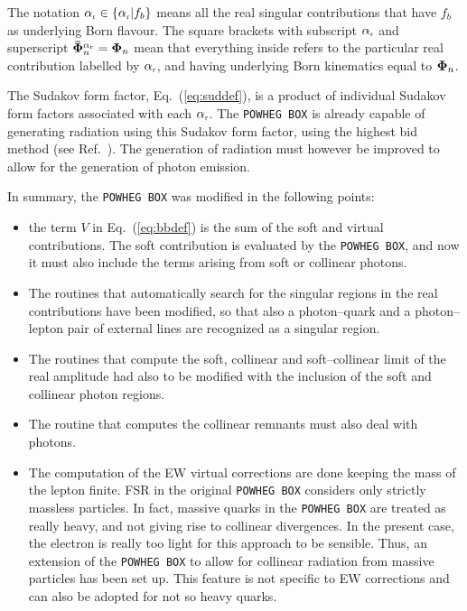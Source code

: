 \documentclass[11pt,a4paper]{article}
\newcommand\fb{{f_b}}
\newcommand\Kinn{{\bf \Phi}_n}
\newcommand\sss{\mathchoice%
{\displaystyle}%
{\scriptstyle}%
{\scriptscriptstyle}%
{\scriptscriptstyle}%
}
\newcommand\frindsing{{\ctindr}}
\newcommand\ctindr{{\alpha_{\sss\rm r}}}
\newcommand\BKinn{{\bf \bar{\Phi}}_n}
\newcommand\POWHEGBOX{\texttt{POWHEG BOX}}
\begin{document}
The notation $\frindsing\in\{\frindsing|\fb\}$ means all the real
singular contributions that have $\fb$ as underlying Born flavour. The
square brackets with subscript $\frindsing$ and superscript
$\BKinn^\frindsing=\Kinn$ mean that everything inside refers to the
particular real contribution labelled by $\frindsing$, and having
underlying Born kinematics equal to $\Kinn$.

The Sudakov form factor, Eq.~(\ref{eq:suddef}), is a product of
individual Sudakov form factors associated with each $\frindsing$.
The \POWHEGBOX{} is already capable of generating radiation
using this Sudakov form factor, using the highest bid method
(see Ref.~\cite{Frixione:2007vw}). The generation of radiation
must however be improved to allow for the generation of photon
emission.

In summary,
the \POWHEGBOX{} was modified in the following points:
\begin{itemize}
\item
the term $V$ in Eq.~(\ref{eq:bbdef}) is the sum of the soft
and virtual contributions. The soft contribution is evaluated by
the \POWHEGBOX{}, and now it must also include the terms arising
from soft or collinear photons.
\item
The routines that automatically search for the singular regions in the
real contributions have been modified, so that also a photon--quark and
a photon--lepton pair of external lines are recognized as a singular
region.
\item
The routines that compute the soft, collinear and soft--collinear limit
of the real amplitude had also to be modified with the inclusion of the
soft and collinear photon regions.
\item
The routine that computes the collinear remnants must also deal
with photons.
\item
The computation of the EW virtual corrections are done keeping the mass
of the lepton finite. FSR in the original \POWHEGBOX{} considers only
strictly massless particles. In fact, massive quarks in the \POWHEGBOX{}
are treated as really heavy, and not giving rise to collinear divergences.
In the present case, the electron is really too light for this approach
to be sensible. Thus, an extension of the \POWHEGBOX{} to allow for
collinear radiation from massive particles has been set up. This feature
is not specific to EW corrections and can also be adopted for not so
heavy quarks.
\end{itemize}
\end{document}
